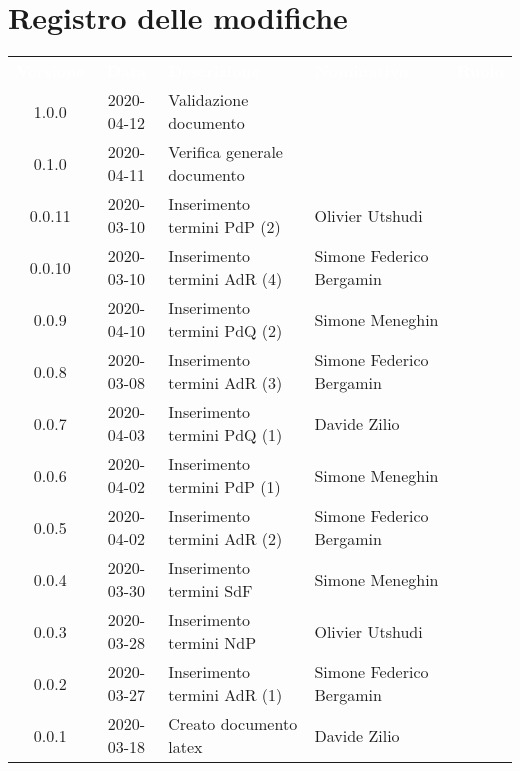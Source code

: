 \section*{Registro delle modifiche}
{
	\centering
	\begin{longtable}{ c c  C{4cm} C{3cm} C{3.5cm} }
		\textcolor{white}{\textbf{Versione}} & \textcolor{white}{\textbf{Data}} & \textcolor{white}{\textbf{Descrizione}} & \textcolor{white}{\textbf{Nominativo}} & \textcolor{white}{\textbf{Ruolo}}\\
		1.0.0 & 2020-04-12 & Validazione documento &  &\RdP{}\\
		0.1.0 & 2020-04-11 & Verifica generale documento &  &\ver{}\\
		0.0.11 & 2020-03-10 & Inserimento termini PdP (2) & Olivier Utshudi &\ana{}\\
		0.0.10 & 2020-03-10 & Inserimento termini AdR (4) & Simone Federico Bergamin &\ana{}\\
		0.0.9 & 2020-04-10 & Inserimento termini PdQ (2) & Simone Meneghin &\ana{}\\
		0.0.8 & 2020-03-08 & Inserimento termini AdR (3) & Simone Federico Bergamin &\ana{}\\
		0.0.7 & 2020-04-03 & Inserimento termini PdQ (1) & Davide Zilio &\ana{}\\
		0.0.6 & 2020-04-02 & Inserimento termini PdP (1) & Simone Meneghin &\ana{}\\
		0.0.5 & 2020-04-02 & Inserimento termini AdR (2) & Simone Federico Bergamin &\ana{}\\
		0.0.4 & 2020-03-30 & Inserimento termini SdF & Simone Meneghin &\ana{}\\
		0.0.3 & 2020-03-28 & Inserimento termini NdP & Olivier Utshudi &\ana{}\\
		0.0.2 & 2020-03-27 & Inserimento termini AdR (1) & Simone Federico Bergamin &\ana{}\\
		0.0.1 & 2020-03-18 & Creato documento latex & Davide Zilio &\ana{}\\		
		
	\end{longtable}

}
